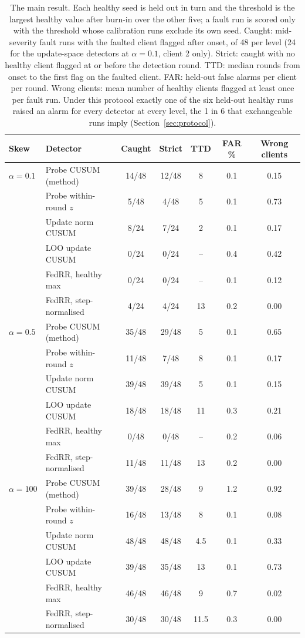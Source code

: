 \begin{table}[t]
\centering
\small
\setlength{\tabcolsep}{4pt}
\begin{tabular}{llccccc}
\toprule
Skew & Detector & Caught & Strict & TTD & FAR \% & Wrong clients \\
\midrule
$\alpha = 0.1$ & Probe CUSUM (method) & 14/48 & 12/48 & 8 & 0.1 & 0.15 \\
 & Probe within-round $z$ & 5/48 & 4/48 & 5 & 0.1 & 0.73 \\
 & Update norm CUSUM & 8/24 & 7/24 & 2 & 0.1 & 0.17 \\
 & LOO update CUSUM & 0/24 & 0/24 & -- & 0.4 & 0.42 \\
 & FedRR, healthy max & 0/24 & 0/24 & -- & 0.1 & 0.12 \\
 & FedRR, step-normalised & 4/24 & 4/24 & 13 & 0.2 & 0.00 \\
\addlinespace
$\alpha = 0.5$ & Probe CUSUM (method) & 35/48 & 29/48 & 5 & 0.1 & 0.65 \\
 & Probe within-round $z$ & 11/48 & 7/48 & 8 & 0.1 & 0.17 \\
 & Update norm CUSUM & 39/48 & 39/48 & 5 & 0.1 & 0.15 \\
 & LOO update CUSUM & 18/48 & 18/48 & 11 & 0.3 & 0.21 \\
 & FedRR, healthy max & 0/48 & 0/48 & -- & 0.2 & 0.06 \\
 & FedRR, step-normalised & 11/48 & 11/48 & 13 & 0.2 & 0.00 \\
\addlinespace
$\alpha = 100$ & Probe CUSUM (method) & 39/48 & 28/48 & 9 & 1.2 & 0.92 \\
 & Probe within-round $z$ & 16/48 & 13/48 & 8 & 0.1 & 0.08 \\
 & Update norm CUSUM & 48/48 & 48/48 & 4.5 & 0.1 & 0.33 \\
 & LOO update CUSUM & 39/48 & 35/48 & 13 & 0.1 & 0.73 \\
 & FedRR, healthy max & 46/48 & 46/48 & 9 & 0.7 & 0.02 \\
 & FedRR, step-normalised & 30/48 & 30/48 & 11.5 & 0.3 & 0.00 \\
\bottomrule
\end{tabular}
\caption{The main result. Each healthy seed is held out in turn and the threshold is the largest healthy value after burn-in over the other five; a fault run is scored only with the threshold whose calibration runs exclude its own seed. Caught: mid-severity fault runs with the faulted client flagged after onset, of 48 per level (24 for the update-space detectors at $\alpha = 0.1$, client 2 only). Strict: caught with no healthy client flagged at or before the detection round. TTD: median rounds from onset to the first flag on the faulted client. FAR: held-out false alarms per client per round. Wrong clients: mean number of healthy clients flagged at least once per fault run. Under this protocol exactly one of the six held-out healthy runs raised an alarm for every detector at every level, the 1 in 6 that exchangeable runs imply (Section~\ref{sec:protocol}).}
\label{tab:pooled}
\end{table}

